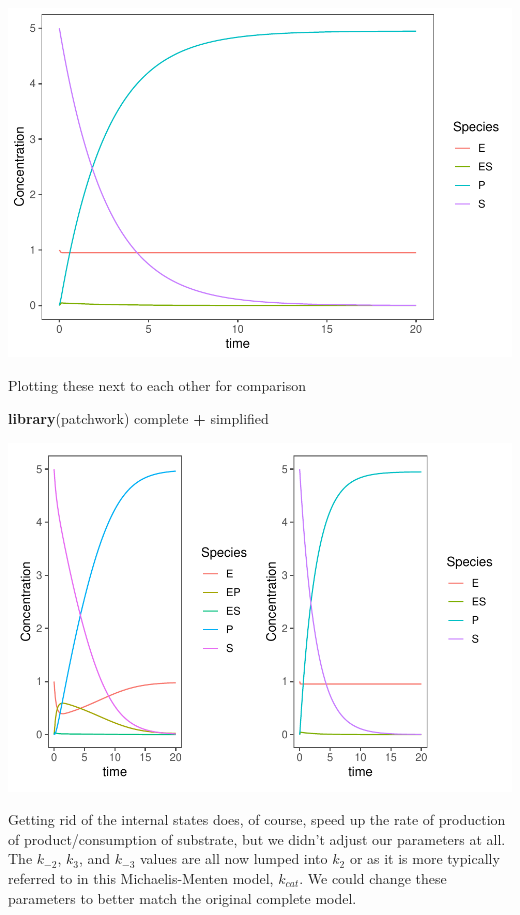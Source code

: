 \documentclass[
]{article}
\newenvironment{Shaded}{\begin{snugshade}}{\end{snugshade}}
\newcommand{\FunctionTok}[1]{\textcolor[rgb]{0.13,0.29,0.53}{\textbf{#1}}}
\newcommand{\NormalTok}[1]{#1}
\newcommand{\SpecialCharTok}[1]{\textcolor[rgb]{0.81,0.36,0.00}{\textbf{#1}}}
\begin{document}
\includegraphics{Bioprocess_Engineering_files/figure-latex/unnamed-chunk-23-1.pdf}

Plotting these next to each other for comparison

\begin{Shaded}
\begin{Highlighting}[]
\FunctionTok{library}\NormalTok{(patchwork)}
\NormalTok{complete }\SpecialCharTok{+}\NormalTok{ simplified}
\end{Highlighting}
\end{Shaded}

\includegraphics{Bioprocess_Engineering_files/figure-latex/unnamed-chunk-24-1.pdf}

Getting rid of the internal states does, of course, speed up the rate of production of product/consumption of substrate, but we didn't adjust our parameters at all. The \(k_{-2}\), \(k_3\), and \(k_{-3}\) values are all now lumped into \(k_2\) or as it is more typically referred to in this Michaelis-Menten model, \(k_{cat}\). We could change these parameters to better match the original complete model.
\end{document}
